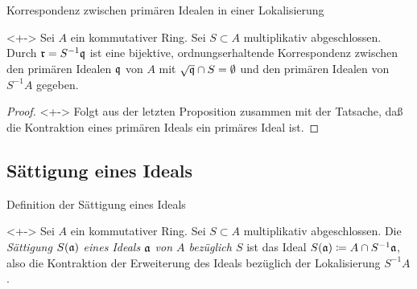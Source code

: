 \begin{frame}{Korrespondenz zwischen primären Idealen in einer Lokalisierung}
	\begin{corollary}<+->
		\label{cor:correspondence_for_primaries}
		Sei \(A\) ein kommutativer Ring. Sei \(S \subset A\) multiplikativ abgeschlossen.
		Durch \(\mathfrak{r} = S^{-1} \mathfrak{q}\) ist eine bijektive, ordnungserhaltende Korrespondenz
		zwischen den primären Idealen \(\mathfrak{q}\) von \(A\) mit \(\sqrt{\mathfrak{q}} \cap S = \emptyset\) und den
		primären Idealen von \(S^{-1} A\) gegeben. 
	\end{corollary}
	\begin{proof}<+->
		Folgt aus der letzten Proposition zusammen mit der Tatsache, daß die Kontraktion eines primären Ideals
		ein primäres Ideal ist.
	\end{proof}
\end{frame}

\subsection{Sättigung eines Ideals}

\begin{frame}{Definition der Sättigung eines Ideals}
	\begin{definition}<+->
		Sei \(A\) ein kommutativer Ring. Sei \(S \subset A\) multiplikativ
		abgeschlossen. Die \emph{Sättigung \(S(\mathfrak{a})\) eines Ideals
		\(\mathfrak{a}\) von \(A\) bezüglich \(S\)} ist das Ideal
		\(S(\mathfrak{a}) \coloneqq A \cap S^{-1} \mathfrak{a}\), also die Kontraktion
		der Erweiterung des Ideals bezüglich der Lokalisierung \(S^{-1} A\).
	\end{definition}
\end{frame}

